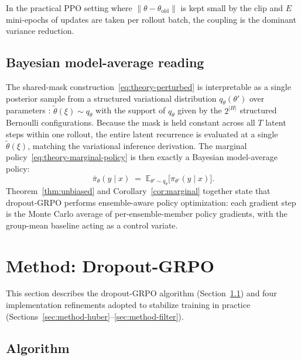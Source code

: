 \documentclass[11pt]{article}
\theoremstyle{definition}
\theoremstyle{remark}
\newcommand{\E}{\mathbb{E}}
\newcommand{\old}{\mathrm{old}}
\begin{document}
In the practical PPO setting where $\|\theta - \theta_\old\|$ is kept
small by the clip and $E$ mini-epochs of updates are taken per rollout
batch, the coupling is the dominant variance reduction.

\subsection{Bayesian model-average reading}
\label{sec:theory-bma}

The shared-mask construction~\eqref{eq:theory-perturbed} is
interpretable as a single posterior sample from a structured
variational distribution $q_\theta(\theta')$ over parameters
\citep{gal2016dropout}: $\tilde\theta(\xi) \sim q_\theta$ with the
support of $q_\theta$ given by the $2^{|H|}$ structured Bernoulli
configurations.  Because the mask is held constant across all $T$
latent steps within one rollout, the entire latent recurrence is
evaluated at a single $\tilde\theta(\xi)$, matching the variational
inference derivation.  The marginal
policy~\eqref{eq:theory-marginal-policy} is then exactly a Bayesian
model-average policy:
\begin{equation}
\bar\pi_\theta(y \mid x)
   \;=\;
\E_{\theta' \sim q_\theta}\!\big[\pi_{\theta'}(y \mid x)\big].
\label{eq:theory-bma}
\end{equation}
Theorem~\ref{thm:unbiased} and Corollary~\ref{cor:marginal} together
state that dropout-GRPO performs ensemble-aware policy optimization:
each gradient step is the Monte Carlo average of per-ensemble-member
policy gradients, with the group-mean baseline acting as a control
variate.

\section{Method: Dropout-GRPO}
\label{sec:method}

This section describes the dropout-GRPO algorithm
(Section~\ref{sec:method-algo}) and four implementation refinements
adopted to stabilize training in practice
(Sections~\ref{sec:method-huber}--\ref{sec:method-filter}).

\subsection{Algorithm}
\label{sec:method-algo}
\end{document}
